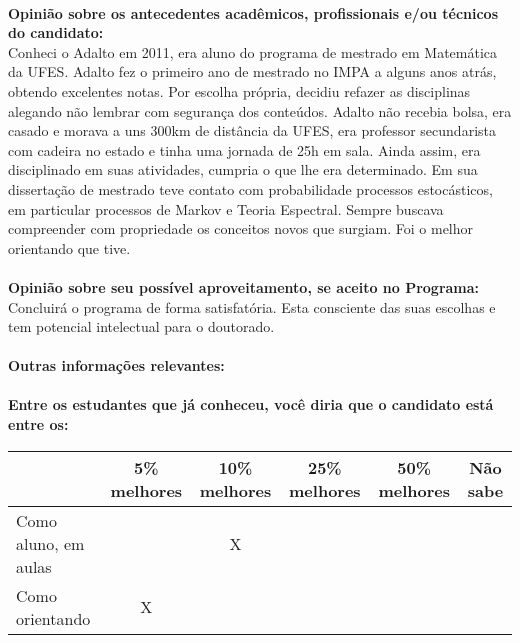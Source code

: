 \documentclass[11pt]{article}
\begin{document}
\\
\textbf{Opinião sobre os antecedentes acadêmicos, profissionais e/ou técnicos do candidato:}
\\Conheci o Adalto em 2011, era aluno do programa de mestrado em Matemática da UFES. Adalto fez o primeiro ano de mestrado no IMPA a alguns anos atrás, obtendo excelentes notas. Por escolha própria, decidiu refazer as disciplinas alegando não lembrar com segurança dos conteúdos. Adalto não recebia bolsa, era casado e morava a uns 300km de distância da UFES, era professor secundarista com cadeira no estado e tinha uma jornada de 25h em sala. Ainda assim, era disciplinado em suas atividades, cumpria o que lhe era determinado. Em sua dissertação de mestrado teve contato com probabilidade processos estocásticos, em particular processos de Markov  e Teoria Espectral.  Sempre buscava compreender com propriedade os conceitos novos que surgiam. Foi o melhor orientando que tive.\\
\\
\textbf{Opinião sobre seu possível aproveitamento, se aceito no Programa:}
\\Concluirá o programa de forma satisfatória. Esta consciente das suas escolhas e tem potencial intelectual para o doutorado.\\ 
\\
\textbf{Outras informações relevantes:} \\
\\[0.3cm]
\textbf{Entre os estudantes que já conheceu, você diria que o candidato está entre os:}
\\
\begin{tabular}{|l|c|c|c|c|c|}
\hline
 & 5\% melhores & 10\% melhores & 25\% melhores & 50\% melhores & Não sabe \\
\hline
Como aluno, em aulas &  & X &  &  & \\
\hline
Como orientando & X &  &  &  & \\
\hline
\end{tabular}
\end{document}
